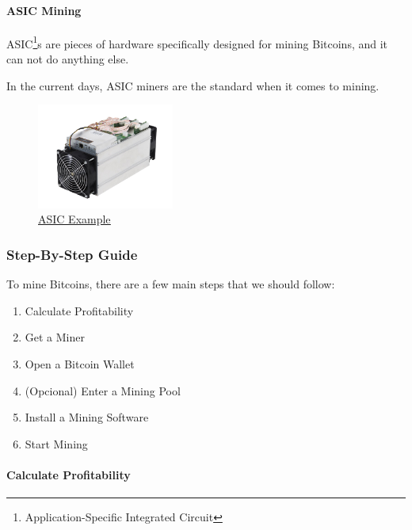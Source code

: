 \documentclass{article}
\newcommand\tab[1][1cm]{\hspace*{#1}}
\begin{document}
\paragraph{ASIC Mining}

\tab ASIC\footnote{Application-Specific Integrated Circuit}s are pieces of hardware specifically designed for mining Bitcoins, and it can not do anything else.

In the current days, ASIC miners are the standard when it comes to mining.

\begin{figure}[H]
    \begin{center}
        \includegraphics[width=0.4\textwidth]{images/asic.png}
        \caption{\href{https://medium.com/crypto-simplified/a-simple-explanation-of-asics-35933d412b2d}{\underline{ASIC Example}}}
    \end{center}
\end{figure}

\newpage

\subsubsection{Step-By-Step Guide}

\tab To mine Bitcoins, there are a few main steps that we should follow:

\begin{enumerate}
    \item Calculate Profitability
    \item Get a Miner
    \item Open a Bitcoin Wallet
    \item (Opcional) Enter a Mining Pool
    \item Install a Mining Software
    \item Start Mining
\end{enumerate}

\paragraph{Calculate Profitability}
\end{document}
